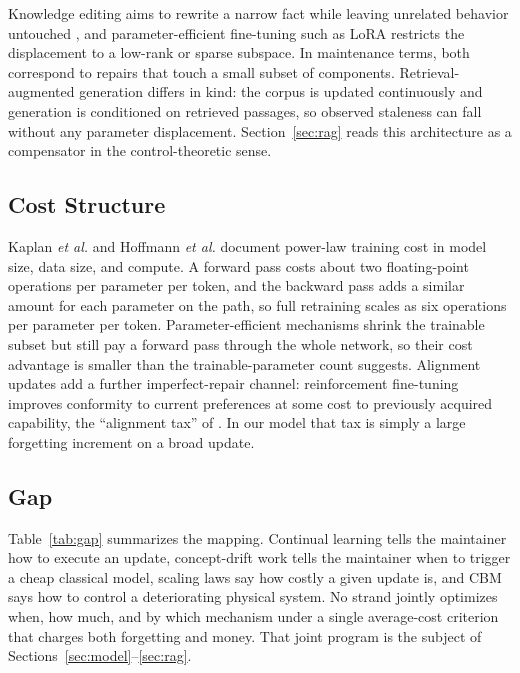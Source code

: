 \documentclass[journal]{IEEEtran}
\begin{document}
Knowledge editing aims to rewrite a narrow fact while leaving unrelated behavior untouched \cite{wang2024,zhang2024}, and parameter-efficient fine-tuning such as LoRA \cite{hu2022} restricts the displacement to a low-rank or sparse subspace. In maintenance terms, both correspond to repairs that touch a small subset of components. Retrieval-augmented generation \cite{gao2023} differs in kind: the corpus is updated continuously and generation is conditioned on retrieved passages, so observed staleness can fall without any parameter displacement. Section~\ref{sec:rag} reads this architecture as a compensator in the control-theoretic sense.

\subsection{Cost Structure}
Kaplan \emph{et al.} \cite{kaplan2020} and Hoffmann \emph{et al.} \cite{hoffmann2022} document power-law training cost in model size, data size, and compute. A forward pass costs about two floating-point operations per parameter per token, and the backward pass adds a similar amount for each parameter on the path, so full retraining scales as six operations per parameter per token. Parameter-efficient mechanisms shrink the trainable subset but still pay a forward pass through the whole network, so their cost advantage is smaller than the trainable-parameter count suggests. Alignment updates add a further imperfect-repair channel: reinforcement fine-tuning improves conformity to current preferences at some cost to previously acquired capability, the ``alignment tax'' of \cite{ouyang2022}. In our model that tax is simply a large forgetting increment on a broad update.

\subsection{Gap}
Table~\ref{tab:gap} summarizes the mapping. Continual learning tells the maintainer how to execute an update, concept-drift work tells the maintainer when to trigger a cheap classical model, scaling laws say how costly a given update is, and CBM says how to control a deteriorating physical system. No strand jointly optimizes when, how much, and by which mechanism under a single average-cost criterion that charges both forgetting and money. That joint program is the subject of Sections~\ref{sec:model}--\ref{sec:rag}.
\end{document}
